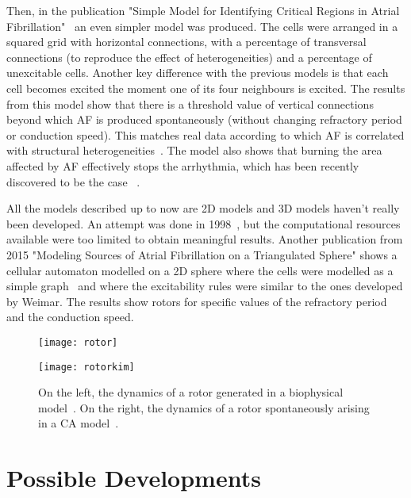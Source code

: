 \documentclass{article}
\begin{document}
Then, in the publication "Simple Model for Identifying Critical Regions in Atrial Fibrillation"~\cite{kim2015} an even simpler model was produced. The cells were arranged in a squared grid with horizontal connections, with a percentage of transversal connections (to reproduce the effect of heterogeneities) and a percentage of unexcitable cells. Another key difference with the previous models is that each cell becomes excited the moment one of its four neighbours is excited. The results from this model show that there is a threshold value of vertical connections beyond which AF is produced spontaneously (without changing refractory period or conduction speed). This matches real data according to which AF is correlated with structural heterogeneities~\cite{arrhythmia_fibrosis2007}. 
The model also shows that burning the area affected by AF effectively stops the arrhythmia, which has been recently discovered to be the case ~\cite{article_kimpaper}. 

All the models described up to now are 2D models and 3D models haven't really been developed. An attempt was done in 1998~\cite{cellauto_3dmodel}, but the computational resources available were too limited to obtain meaningful results. Another publication from 2015 "Modeling Sources of Atrial Fibrillation on a Triangulated Sphere" shows a cellular automaton modelled on a 2D sphere where the cells were modelled as a simple graph~\cite{cellauto_sphere2015} and where the excitability rules were similar to the ones developed by Weimar. The results show rotors for specific values of the refractory period and the conduction speed. 

\begin{figure}[H]
\centering
\begin{minipage}[t]{.5\textwidth}
  \centering
  \texttt{[image: rotor]}
  \label{rot}
\end{minipage}%
\begin{minipage}[t]{.5\textwidth}
  \centering
  \texttt{[image: rotorkim]}
  \label{rotkim}
\end{minipage}
\caption{On the left, the dynamics of a rotor generated in a biophysical model~\cite{arrhythmia_rotorsreview2013}. On the right, the dynamics of a rotor spontaneously arising in a CA model~\cite{kim2015}.}
\label{rotor}
\end{figure}
 
\section{Possible Developments} 
 
\end{document}
